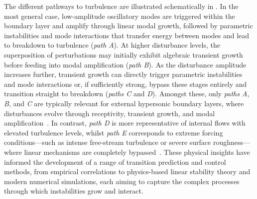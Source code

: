 The different pathways to turbulence are illustrated schematically in . In the most general case, low-amplitude oscillatory modes are triggered within the boundary layer and amplify through linear modal growth, followed by parametric instabilities and mode interactions that transfer energy between modes and lead to breakdown to turbulence (\textit{path A}). At higher disturbance levels, the superposition of perturbations may initially exhibit algebraic transient growth before feeding into modal amplification (\textit{path B}). As the disturbance amplitude increases further, transient growth can directly trigger parametric instabilities and mode interactions or, if sufficiently strong, bypass these stages entirely and transition straight to breakdown (\textit{paths C} and \textit{D}). Amongst these, only \textit{paths A}, \textit{B}, and \textit{C} are typically relevant for external hypersonic boundary layers, where disturbances evolve through receptivity, transient growth, and modal amplification~\citep{Lefieux2021}. In contrast, \textit{path D} is more representative of internal flows with elevated turbulence levels, whilst \textit{path E} corresponds to extreme forcing conditions---such as intense free-stream turbulence or severe surface roughness---where linear mechanisms are completely bypassed~\citep{Reshotko2001}. These physical insights have informed the development of a range of transition prediction and control methods, from empirical correlations to physics-based linear stability theory and modern numerical simulations, each aiming to capture the complex processes through which instabilities grow and interact.

